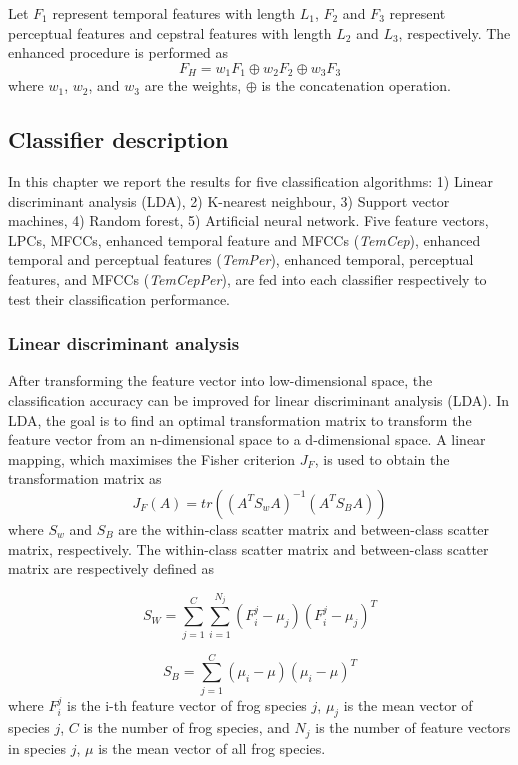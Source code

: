 Let $F_{1}$ represent temporal features with length $L_{1}$, $F_{2}$ and $F_{3}$ represent perceptual features and cepstral features with length $L_{2}$ and $L_{3}$, respectively. The enhanced procedure is performed as
\begin{equation}
F_{H} = w_{1}F_{1}\oplus w_{2}F_{2} \oplus w_{3}F_{3}
\end{equation} 
where $w_{1}$, $w_{2}$, and $w_{3}$ are the weights, $\oplus$ is the concatenation operation.


\subsection{Classifier description}

\label{ch4:classifierDesign}
In this chapter we report the results for five classification algorithms: 1) Linear discriminant analysis (LDA), 2) K-nearest neighbour, 3) Support vector machines, 4) Random forest, 5) Artificial neural network. Five feature vectors, LPCs, MFCCs, enhanced temporal feature and MFCCs (\textit{TemCep}), enhanced temporal and perceptual features (\textit{TemPer}), enhanced temporal, perceptual features, and MFCCs (\textit{TemCepPer}), are fed into each classifier respectively to test their classification performance.

\subsubsection{Linear discriminant analysis}
After transforming the feature vector into low-dimensional space, the classification accuracy can be improved for linear discriminant analysis (LDA). In LDA, the goal is to find an optimal transformation matrix to transform the feature vector from an n-dimensional space to a d-dimensional space. A linear mapping, which maximises the Fisher criterion $J_{F}$, is used to obtain the transformation matrix as
\begin{equation}
J_{F}(A)=tr((A^{T}S_{w}A)^{-1}(A^{T}S_{B}A))
\end{equation}
where $S_{w}$ and $S_{B}$ are the within-class scatter matrix and between-class scatter matrix, respectively. The within-class scatter matrix and between-class scatter matrix are respectively defined as 

\begin{equation}
S_{W}=\sum_{j=1}^{C}\sum_{i=1}^{N_{j}}(F_{i}^{j}-\mu_{j})(F_{i}^{j}-\mu_{j})^{T}
\end{equation}

\begin{equation}
S_{B}=\sum_{j=1}^{C}(\mu_{i}-\mu)(\mu_{i}-\mu)^{T}
\end{equation}
where $F_{i}^{j}$ is the i-th feature vector of frog species $j$, $\mu_{j}$ is the mean vector of species $j$, $C$ is the number of frog species, and $N_{j}$ is the number of feature vectors in species $j$, $\mu$ is the mean vector of all frog species.

